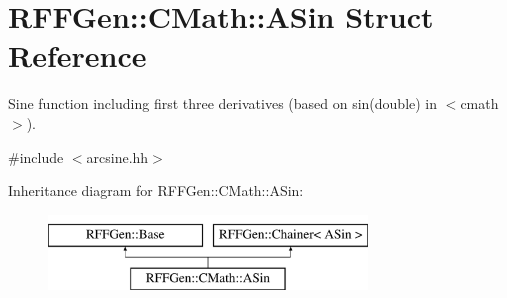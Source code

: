 \hypertarget{structRFFGen_1_1CMath_1_1ASin}{\section{R\-F\-F\-Gen\-:\-:C\-Math\-:\-:A\-Sin Struct Reference}
\label{structRFFGen_1_1CMath_1_1ASin}
}


Sine function including first three derivatives (based on sin(double) in $<$cmath$>$).  




{\ttfamily \#include $<$arcsine.\-hh$>$}

Inheritance diagram for R\-F\-F\-Gen\-:\-:C\-Math\-:\-:A\-Sin\-:\begin{figure}[H]
\begin{center}
\leavevmode
\includegraphics[height=2.000000cm]{structRFFGen_1_1CMath_1_1ASin}
\end{center}
\end{figure}
